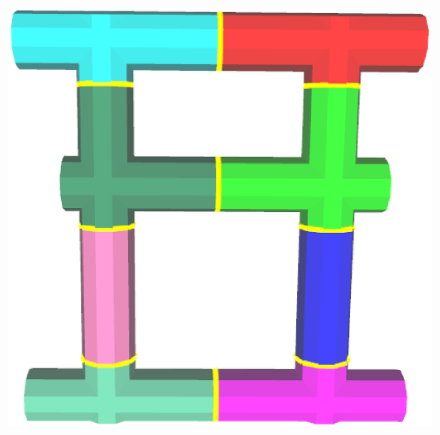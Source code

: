 \begin{figure} [htbp]
{\begin{minipage}[b]{0.22\textwidth}
      \includegraphics[scale=0.13]{figs/f6.BEsplit-B-init.eps}
    \end{minipage}}
\end{figure}
